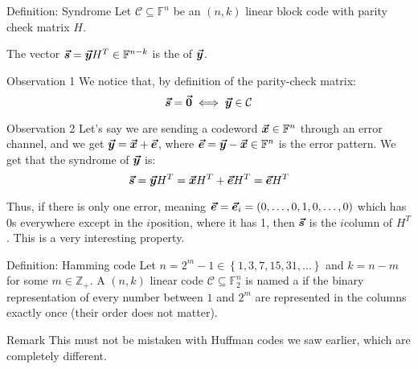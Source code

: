 \documentclass[a4paper]{article}
\begin{document}
\begin{parag}{Definition: Syndrome}
    Let $\mathcal{C} \subseteq \mathbb{F}^n$  be an $\left(n, k\right)$ linear block code with parity check matrix $H$.

    The vector $\bm{\protect\vec{s}} = \bm{\protect\vec{y}} H^T \in \mathbb{F}^{n-k}$ is the  of $\bm{\protect\vec{y}}$.

    \begin{subparag}{Observation 1}
        We notice that, by definition of the parity-check matrix: 
        \[\bm{\protect\vec{s}} = \bm{\protect\vec{0}} \iff \bm{\protect\vec{y}} \in \mathcal{C}\]
    \end{subparag}

    \begin{subparag}{Observation 2}
        Let's say we are sending a codeword $\bm{\protect\vec{x}} \in \mathbb{F}^n$ through an error channel, and we get $\bm{\protect\vec{y}} = \bm{\protect\vec{x}} + \bm{\protect\vec{e}}$, where $\bm{\protect\vec{e}} = \bm{\protect\vec{y}} - \bm{\protect\vec{x}} \in \mathbb{F}^n$ is the error pattern. We get that the syndrome of $\bm{\protect\vec{y}}$ is: 
        \[\bm{\protect\vec{s}} = \bm{\protect\vec{y}} H^T = \bm{\protect\vec{x}} H^T + \bm{\protect\vec{e}} H^T = \bm{\protect\vec{e}} H^T\]

        Thus, if there is only one error, meaning $\bvec{e} = \bvec{e}_i = \left(0, \ldots, 0, 1, 0, \ldots, 0\right)$ which has 0s everywhere except in the $i$\Th position, where it has 1, then $\bm{\protect\vec{s}}$ is the $i$\Th column of $H^T$. This is a very interesting property.
    \end{subparag}
    
\end{parag}

\begin{parag}{Definition: Hamming code}
    Let $n = 2^m - 1 \in \left\{1, 3, 7, 15, 31, \ldots\right\}$ and $k = n - m$ for some $m \in \mathbb{Z}_+$. A $\left(n, k\right)$ linear code $\mathcal{C} \subseteq \mathbb{F}_2^n$ is named a  if the binary representation of every number between $1$ and $2^m$ are represented in the columns exactly once (their order does not matter).

    \begin{subparag}{Remark}
        This must not be mistaken with Huffman codes we saw earlier, which are completely different.
    \end{subparag}
\end{parag}
\end{document}
